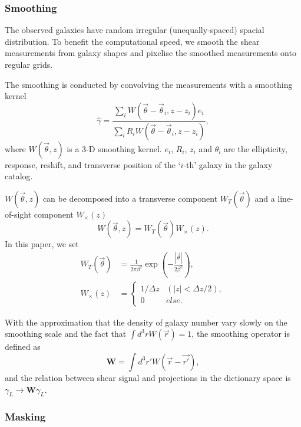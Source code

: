 \documentclass[twocolumn]{aastex62}
\begin{document}
\subsubsection{Smoothing}
\label{subsec:method-smoothing}

The observed galaxies have random irregular (unequally-spaced) spacial distribution. To benefit the computational
speed, we smooth the shear measurements from galaxy shapes and pixelise the smoothed measurements onto regular grids.

The smoothing is conducted by convolving the measurements with a smoothing kernel
\begin{equation}
\hat{\gamma}  = \frac{\sum_i  W(\vec{\theta}-\vec{{\theta}}_i,z-z_i) e_i}{\sum_i R_i W(\vec{\theta}-\vec{{\theta}}_i,z-z_i) },
\end{equation}
where $W(\vec{\theta},z)$ is a $3$-D smoothing kernel. $e_i$, $R_i$, $z_i$ and $\theta_i$ are the ellipticity,
response, reshift, and transverse position of the `$i$-th' galaxy in the galaxy catalog.

$W(\vec{\theta},z)$ can be decomposed into a transverse component $W_T(\vec{\theta})$ and a line-of-sight component
$W_\times(z)$
\begin{equation}
W(\vec{\theta},z)=W_T(\vec{\theta}) W_\times (z).
\end{equation}
In this paper, we set
\begin{equation}
\begin{split}
W_T(\vec{\theta}) &=\frac{1}{2\pi\beta^2}\exp(-\frac{|\vec{\theta}|}{2\beta^2}),\\
W_\times (z) &=
\begin{cases}
1/\Delta z& (|z|<\Delta z/2),\\
0& else.
\end{cases}
\end{split}
\end{equation}

With the approximation that the density of galaxy number vary slowly on the smoothing scale and the fact that
$\int d^3r W(\vec{r})=1$, the smoothing operator is defined as
\begin{equation}
\mathbf{W} = \int d^3 r' W(\vec{r}-\vec{r'}),
\end{equation}
and the relation between shear signal and projections in the dictionary space is
$\gamma_L \rightarrow \mathbf{W} \gamma_L$.

\subsubsection{Masking}
\label{subsec:method-msknoise}
\end{document}
